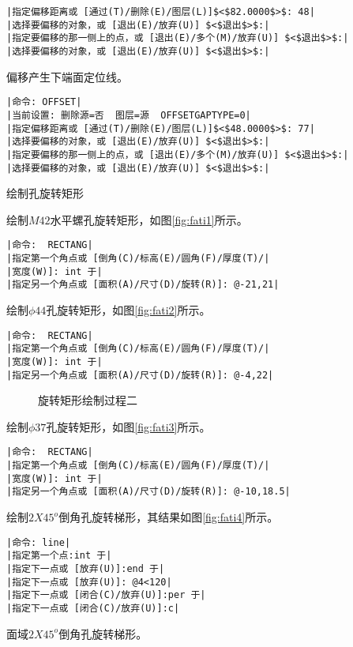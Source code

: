 \begin{procedure}
\begin{lstlisting}
|指定偏移距离或 [通过(T)/删除(E)/图层(L)]$<$82.0000$>$: 48|
|选择要偏移的对象，或 [退出(E)/放弃(U)] $<$退出$>$:|
|指定要偏移的那一侧上的点，或 [退出(E)/多个(M)/放弃(U)] $<$退出$>$:|
|选择要偏移的对象，或 [退出(E)/放弃(U)] $<$退出$>$:|
\end{lstlisting}
偏移产生下端面定位线。
\begin{lstlisting}
|命令: OFFSET|
|当前设置: 删除源=否  图层=源  OFFSETGAPTYPE=0|
|指定偏移距离或 [通过(T)/删除(E)/图层(L)]$<$48.0000$>$: 77|
|选择要偏移的对象，或 [退出(E)/放弃(U)] $<$退出$>$:|
|指定要偏移的那一侧上的点，或 [退出(E)/多个(M)/放弃(U)] $<$退出$>$:|
|选择要偏移的对象，或 [退出(E)/放弃(U)] $<$退出$>$:|
\end{lstlisting}
\item 绘制孔旋转矩形

绘制$M42$水平螺孔旋转矩形，如图\ref{fig:fati1}所示。
\begin{lstlisting}
|命令:  RECTANG|
|指定第一个角点或 [倒角(C)/标高(E)/圆角(F)/厚度(T)/|
|宽度(W)]: int 于|
|指定另一个角点或 [面积(A)/尺寸(D)/旋转(R)]: @-21,21|
\end{lstlisting}
绘制$\phi 44$孔旋转矩形，如图\ref{fig:fati2}所示。
\begin{lstlisting}
|命令:  RECTANG|
|指定第一个角点或 [倒角(C)/标高(E)/圆角(F)/厚度(T)/|
|宽度(W)]: int 于|
|指定另一个角点或 [面积(A)/尺寸(D)/旋转(R)]: @-4,22|
\end{lstlisting}
\begin{figure}[htbp]
\centering
{}\hspace{30pt}
\hspace{30pt}
\caption{旋转矩形绘制过程二}
\end{figure}
绘制$\phi 37$孔旋转矩形，如图\ref{fig:fati3}所示。
\begin{lstlisting}
|命令:  RECTANG|
|指定第一个角点或 [倒角(C)/标高(E)/圆角(F)/厚度(T)/|
|宽度(W)]: int 于|
|指定另一个角点或 [面积(A)/尺寸(D)/旋转(R)]: @-10,18.5|
\end{lstlisting}
绘制$2X45^o$倒角孔旋转梯形，其结果如图\ref{fig:fati4}所示。
\begin{lstlisting}
|命令: line|
|指定第一个点:int 于|
|指定下一点或 [放弃(U)]:end 于|
|指定下一点或 [放弃(U)]: @4<120|
|指定下一点或 [闭合(C)/放弃(U)]:per 于|
|指定下一点或 [闭合(C)/放弃(U)]:c|
\end{lstlisting}
面域$2X45^o$倒角孔旋转梯形。

\end{procedure}
